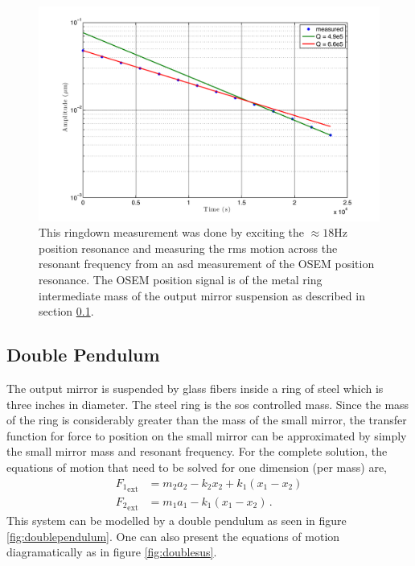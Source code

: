 \begin{figure}
\centering
\includegraphics[width=15cm]{./figures/Qmeasurement.pdf}
\caption[Q Measurement of Glass Suspension]{
    This ringdown measurement was done by exciting the $\approx 18\mathrm{Hz}$
    position resonance and measuring the rms motion across the resonant
    frequency from an \ac{asd} measurement of the OSEM position resonance.
    The OSEM position signal is of the metal ring intermediate mass of the
    output mirror suspension as described in section \ref{sec:doublepend}.
    }
\label{fig:Qmeasurement}
\end{figure}

\subsection{Double Pendulum}
\label{sec:doublepend}
The output mirror is suspended by glass fibers inside a ring of steel which is
three inches in diameter. The steel ring is the \ac{sos} controlled mass.
Since the mass of the ring is considerably greater than the mass of the small
mirror, the transfer function for force to position on the small mirror can be
approximated by simply the small mirror mass and resonant frequency.
For the complete solution, the equations of motion that need to be solved for
one dimension (per mass) are,
\begin{align}
{F_1}_{\mathrm{ext}} &= m_2a_2-k_2x_2+k_1\left(x_1-x_2\right) \\
{F_2}_{\mathrm{ext}} &= m_1a_1-k_1\left(x_1-x_2\right) \, .
\end{align}
This system can be modelled by a double pendulum as seen in figure
\ref{fig:doublependulum}.
One can also present the equations of motion diagramatically as in figure
\ref{fig:doublesus}.


